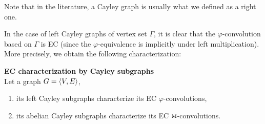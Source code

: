 \begin{remark}
Note that in the literature, a Cayley graph is usually what we defined as a right one. %
\end{remark}

In the case of left Cayley graphs of vertex set $\Gamma$, it is clear that the $\varphi$-convolution based on $\Gamma$ is EC (since the $\varphi$-equivalence is implicitly under left multiplication).
More precisely, we obtain the following characterization:

\begin{theorem}\textbf{EC characterization by Cayley subgraphs}\\
Let a graph $G = \langle V, E \rangle$,
\begin{enumerate}[nolistsep,noitemsep,label=(\roman*)]
\item its left Cayley subgraphs characterize its EC $\varphi$-convolutions,
\item its abelian Cayley subgraphs characterize its EC $\operatorname{\textsc{m}}$-convolutions.
\end{enumerate}
\label{th:cayleychar}
\end{theorem}

